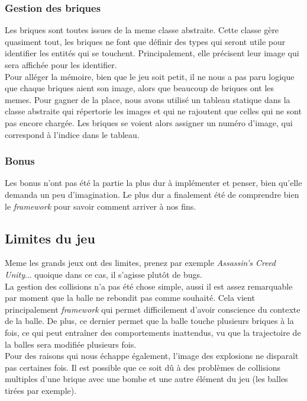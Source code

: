 \documentclass[a4paper,10pt]{article}
\begin{document}
    \subsubsection{Gestion des briques}
        Les briques sont toutes issues de la meme classe abstraite. Cette classe gère quasiment tout, les briques ne font
        que définir des types qui seront utile pour identifier les entités qui se touchent. Principalement, elle
        précisent leur image qui sera affichée pour les identifier. \\

        Pour alléger la mémoire, bien que le jeu soit petit, il ne nous a pas paru logique que chaque briques aient
        son image, alors que beaucoup de briques ont les memes. Pour gagner de la place, nous avons utilisé un tableau
        statique dans la classe abstraite qui répertorie les images et qui ne rajoutent que celles qui ne sont pas
        encore chargée. Les briques se voient alors assigner un numéro d'image, qui correspond à l'indice dans le
        tableau.

    \subsubsection{Bonus}
        Les bonus n'ont pas été la partie la plus dur à implémenter et penser, bien qu'elle demanda un peu
        d'imagination. Le plus dur a finalement été de comprendre bien le \textit{framework} pour savoir
        comment arriver à nos fins.


\subsection{Limites du jeu}
Meme les grands jeux ont des limites, prenez par exemple \textit{Assassin's Creed Unity}... quoique dans ce cas,
il s'agisse plutôt de bugs. \\

La gestion des collisions n'a pas été chose simple, aussi il est assez remarquable par moment que la balle
ne rebondit pas comme souhaité. Cela vient principalement \textit{framework} qui permet difficilement d'avoir
conscience du contexte de la balle. De plus, ce dernier permet que la balle touche plusieurs briques à la fois,
ce qui peut entraîner des comportements inattendus, vu que la trajectoire de la balles sera modifiée plusieurs fois. \\

Pour des raisons qui nous échappe également, l'image des explosions ne disparaît pas certaines fois. Il est possible
que ce soit dû à des problèmes de collisions multiples d'une brique avec une bombe et une autre élément du jeu (les
balles tirées par exemple).
\end{document}
